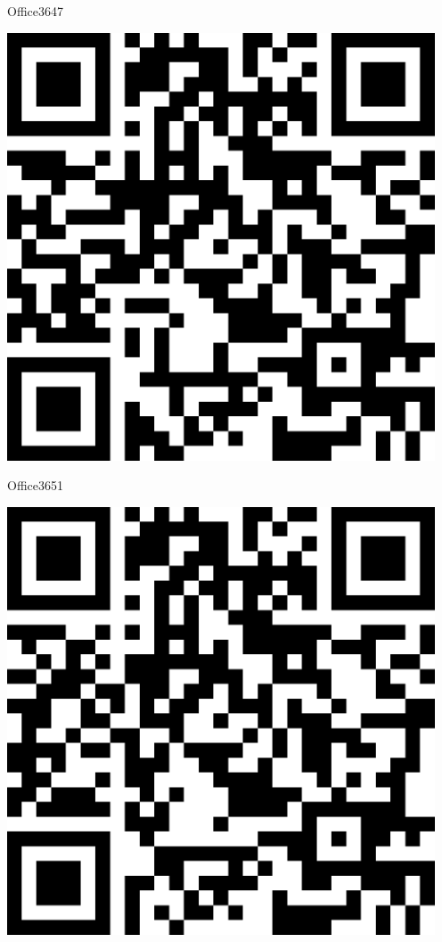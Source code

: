 \documentclass[letterpaper]{article}
\begin{document}
 \hfill{\small Office3647} 

 \vspace{1in} 
 \pagebreak 
{} 
 \vspace*{\fill} 
 \begingroup 
 \centerline{\includegraphics[scale=1,width=5in,height=5in]{Office3651.png}} 
 \endgroup 
 \vspace*{\fill} 

 \hfill{\small Office3651} 

 \vspace{1in} 
 \pagebreak 
{} 
 \vspace*{\fill} 
 \begingroup 
 \centerline{\includegraphics[scale=1,width=5in,height=5in]{Office3655.png}} 
 \endgroup 
 \vspace*{\fill} 
\end{document}
